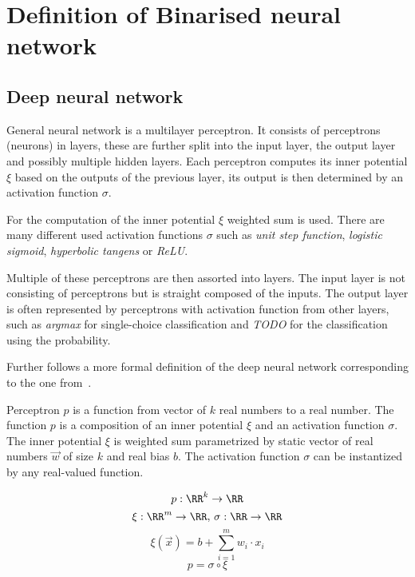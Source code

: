 \section{Definition of Binarised neural network}

\subsection{Deep neural network}


General neural network is a multilayer perceptron. It consists of perceptrons (neurons) in layers,
these are further split into the input layer, the output layer and possibly multiple
hidden layers. Each perceptron computes its inner potential $\xi$ based on the outputs of
the previous layer, its output is then determined by an activation function $\sigma$.

For the computation of the inner potential $\xi$ weighted sum is used.
There are many different used activation functions $\sigma$ such as
\textit{unit step function}, \textit{logistic sigmoid},
\textit{hyperbolic tangens} or \textit{ReLU}.

Multiple of these perceptrons are then assorted into layers. The input layer is not
consisting of perceptrons but is straight composed of the inputs. The output layer is
often represented by perceptrons with activation function from other layers, such as
\textit{argmax} for single-choice classification and
\textit{TODO} %
for the classification using the probability.

Further follows a more formal definition of the deep neural network
corresponding to the one from~\cite{Bishop1995NeuralNF}.

\sectionsep{}

\begin{definition}[Perceptron]
Perceptron $p$ is a function from vector of $k$ real numbers to a real number.
The function $p$ is a composition of an inner potential $\xi$
and an activation function $\sigma$. The inner potential $\xi$ is weighted sum
parametrized by static vector of real numbers
$\vec w$ of size $k$ and real bias $b$.
The activation function $\sigma$ can be instantized by any real-valued function.

\begin{equation*}
	p: \RR^k \to \RR
\end{equation*}
\begin{equation*}
	\xi: \RR^m \to \RR, \,
	\sigma: \RR \to \RR
\end{equation*}
\begin{equation*}
	\xi(\vec x) = b + \sum_{i=1}^m w_i\cdot x_i
\end{equation*}
\begin{equation*}
	p = \sigma \circ \xi
\end{equation*}
\end{definition}

